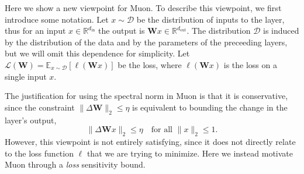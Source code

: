 \documentclass[11pt]{article}
\newcommand{\mat}[1]{\bm{#1}}
\newcommand{\cD}{\mathcal{D}}
\newcommand{\cL}{\mathcal{L}}
\newcommand{\R}{\mathbb{R}}
\newcommand{\EE}[2]{\mathbb{E}_{#1}\left[#2\right] }
\newcommand{\norm}[1]{\| #1\|}
\begin{document}
Here we show a new viewpoint for Muon. To describe this viewpoint, we first introduce some notation.
  Let $x\sim \cD$ be the distribution of inputs to the layer, thus for an input $x\in \R^{d_{\mathrm{in}}}$ the output is $\mat{W}x\in \R^{d_{\mathrm{out}}}$. The distribution $\cD$ is induced by the distribution of the data and by the parameters of the preceeding layers,  but we will omit this dependence for  simplicity.
Let 
$\cL(\mat{W}) =\EE{x\sim \cD}{ \ell(\mat{W}x)}$ be the loss, where $\ell(\mat{W}x)$ is the loss on a single input $x$. 



The justification for using the spectral norm in Muon is that it is conservative, since the constraint $\norm{\Delta\mat{W}}_2 \le \eta$ is equivalent to bounding the change in the layer's output,
\[\norm{\Delta\mat{W} x}_2 \leq \eta \quad \text{for all } \norm{x}_2 \leq 1.\]
However, this viewpoint is not entirely satisfying, since it does not directly relate to the loss function $\ell$ that we are trying to minimize.
Here we instead motivate Muon through a \emph{loss} sensitivity bound. 
\end{document}
